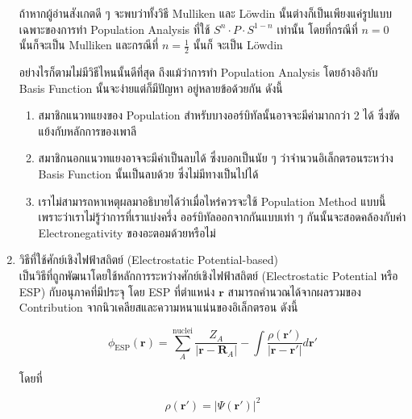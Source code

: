 \begin{enumerate}
          ถ้าหากผู้อ่านสังเกตดี ๆ จะพบว่าทั้งวิธี Mulliken และ L\"{o}wdin นั้นต่างก็เป็นเพียงแค่รูปแบบเฉพาะของการทำ Population Analysis
          ที่ใช้ $S^{n} \cdot P \cdot S^{1-n}$ เท่านั้น โดยที่กรณีที่ $n=0$ นั้นก็จะเป็น Mulliken และกรณีที่ $n=\frac{1}{2}$ นั้นก็%
          จะเป็น L\"{o}wdin

          อย่างไรก็ตามไม่มีวิธีไหนนั้นดีที่สุด ถึงแม้ว่าการทำ Population Analysis โดยอ้างอิงกับ Basis Function นั้นจะง่ายแต่ก็มีปัญหา%
          อยู่หลายข้อด้วยกัน ดังนี้

          \begin{enumerate}[topsep=0pt]
              \item สมาชิกแนวทแยงของ Population สำหรับบางออร์บิทัลนั้นอาจจะมีค่ามากกว่า 2 ได้ ซึ่งขัดแย้งกับหลักการของเพาลี

              \item สมาชิกนอกแนวทแยงอาจจะมีค่าเป็นลบได้ ซึ่งบอกเป็นนัย ๆ ว่าจำนวนอิเล็กตรอนระหว่าง Basis Function นั้นเป็นลบด้วย%
                    ซึ่งไม่มีทางเป็นไปได้

              \item เราไม่สามารถหาเหตุผลมาอธิบายได้ว่าเมื่อไหร่ควรจะใช้ Population Method แบบนี้เพราะว่าเราไม่รู้ว่าการที่เราแบ่งครึ่ง%
                    ออร์บิทัลออกจากกันแบบเท่า ๆ กันนั้นจะสอดคล้องกับค่า Electronegativity ของอะตอมด้วยหรือไม่
          \end{enumerate}

    \item วิธีที่ใช้ศักย์เชิงไฟฟ้าสถิตย์ (Electrostatic Potential-based) \\

          เป็นวิธีที่ถูกพัฒนาโดยใช้หลักการระหว่างศักย์เชิงไฟฟ้าสถิตย์ (Electrostatic Potential หรือ ESP) กับอนุภาคที่มีประจุ โดย ESP
          ที่ตำแหน่ง $\bm{r}$ สามารถคำนวณได้จากผลรวมของ Contribution จากนิวเคลียสและความหนาแน่นของอิเล็กตรอน ดังนี้

          \begin{equation}\label{eq:esp_population}
              \phi_{\text{ESP}}(\bm{r}) = \sum^{\text{nuclei}}_{A} \frac{Z_{A}}{|\bm{r} - \bm{R}_{A}|}
              - \int \frac{\rho(\bm{r}')}{|\bm{r} - \bm{r}'|} d\bm{r}'
          \end{equation}

          \noindent โดยที่

          \begin{equation}
              \rho(\bm{r}') = |\Psi(\bm{r}')|^{2}
          \end{equation}


\end{enumerate}
